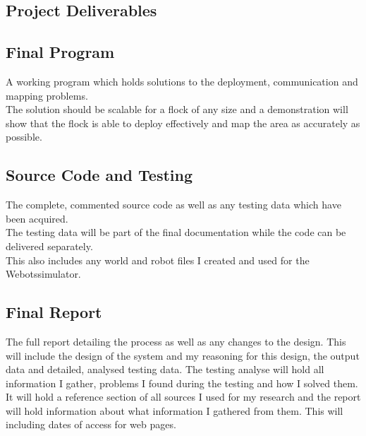 \documentclass[10pt,a4paper]{article}
\begin{document}
\begin{flushleft}
\section{Project Deliverables}
\subsection{Final Program}
A working program which holds solutions to the deployment, communication and mapping problems. \\
The solution should be scalable for a flock of any size and a demonstration will show that the flock is able to deploy effectively and map the area as accurately as possible. 

\subsection{Source Code and Testing}
The complete, commented source code as well as any testing data which have been acquired. \\
The testing data will be part of the final documentation while the code can be delivered separately.\\
This also includes any world and robot files I created and used for the Webots\texttrademark simulator.

\subsection{Final Report}
The full report detailing the process as well as any changes to the design. This will include the design of the system and my reasoning for this design, the output data and detailed, analysed testing data. The testing analyse will hold all information I gather, problems I found during the testing and how I solved them. \\
It will hold a reference section of all sources I used for my research and the report will hold information about what information I gathered from them.  This will including dates of access for web pages. \\

\newpage




\end{flushleft}
\end{document}
